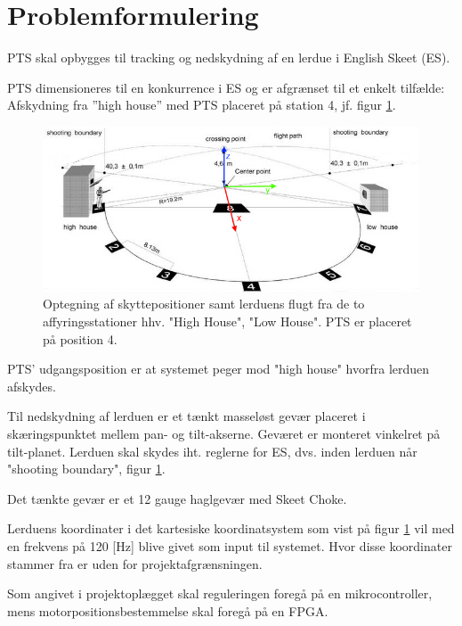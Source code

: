 \section{Problemformulering}
\label{sec:problemformulering}

PTS skal opbygges til tracking og nedskydning af en lerdue i English Skeet (ES).

PTS dimensioneres til en konkurrence i ES og er afgrænset til et enkelt tilfælde:
Afskydning fra ”high house” med PTS placeret på station 4, jf. figur \ref{fig:ES}.
\begin{figure}[th!]
\centering
\includegraphics[width=1\textwidth]{./graphics/skeet_diagram_cropped_axes}
\caption[Skitse af ES]{Optegning af skyttepositioner samt lerduens flugt fra de to affyringsstationer hhv. "High House", "Low House". PTS er placeret på position 4.}
\label{fig:ES}
\end{figure}	
PTS' udgangsposition er at systemet peger mod "high house" hvorfra lerduen afskydes.



Til nedskydning af lerduen er et tænkt masseløst gevær placeret i skæringspunktet mellem pan- og tilt-akserne.
Geværet er monteret vinkelret på tilt-planet. 
Lerduen skal skydes iht. reglerne for ES, dvs. inden lerduen når "shooting boundary", figur \ref{fig:ES}.

Det tænkte gevær er et 12 gauge haglgevær med Skeet Choke.

Lerduens koordinater i det kartesiske koordinatsystem som vist på figur \ref{fig:ES}
vil med en frekvens på 120 [Hz] blive givet som input til systemet. 
Hvor disse koordinater stammer fra er uden for projektafgrænsningen.

Som angivet i projektoplægget skal reguleringen foregå på en mikrocontroller,
mens motorpositionsbestemmelse skal foregå på en FPGA.